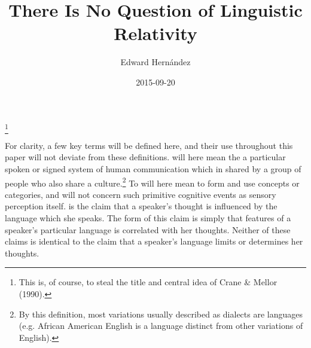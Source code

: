 \documentclass[doc,12pt]{apa6}
\newcommand\blfootnote[1]{%
  \begingroup
  \renewcommand\thefootnote{}\footnote{#1}%
  \addtocounter{footnote}{-1}%
  \endgroup
}
\begin{document}
\title{There Is No Question of Linguistic Relativity}
\author{Edward Hern\'{a}ndez}
\date{2015-09-20}
\maketitle

\blfootnote{This is, of course, to steal the title and central idea of Crane \& Mellor (1990).}
\nocite{Crane90}

For clarity, a few key terms will be defined here, and their use throughout
this paper will not deviate from these definitions.  will here
mean the a particular spoken or signed system of human communication which in
shared by a group of people who also share a culture.\footnote{By this
definition, most variations usually described as dialects are languages (e.g.
African American English is a language distinct from other variations of
English).} To  will here mean to form and use concepts or
categories, and will not concern such primitive cognitive events as sensory
perception itself.  is the claim that a speaker's
thought is influenced by the language which she speaks. The  form of
this claim is simply that features of a speaker's particular language is
correlated
with her thoughts. Neither of these claims is identical to  the claim that a speaker's language limits or determines her
thoughts.
\end{document}
